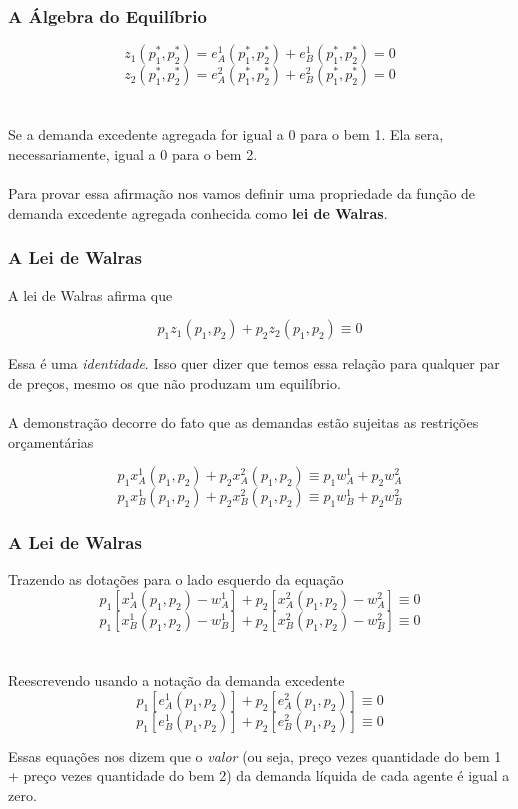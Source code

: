 \documentclass{beamer}[10]
\begin{document}
\begin{frame}
	\frametitle{A Álgebra do Equilíbrio}

	$$z_1(p_1^*,p_2^*) = e_A^1(p_1^*,p_2^*) + e_B^1(p_1^*,p_2^*) = 0$$
	$$z_2(p_1^*,p_2^*) = e_A^2(p_1^*,p_2^*) + e_B^2(p_1^*,p_2^*) = 0$$
	\\~\\
	Se a demanda excedente agregada for igual a 0 para o bem 1. Ela sera, necessariamente, igual a 0 para o bem 2. 
	\\~\\
	Para provar essa afirmação nos vamos definir uma propriedade da função de demanda excedente agregada conhecida como \textbf{lei de Walras}.

\end{frame}

\begin{frame}
	\frametitle{A Lei de Walras}

	A lei de Walras afirma que

	$$p_1 z_1(p_1,p_2) + p_2 z_2(p_1,p_2) \equiv 0$$

	Essa é uma \textit{identidade}. Isso quer dizer que temos essa relação para qualquer par de preços, mesmo os que não produzam um equilíbrio.
	\\~\\
	A demonstração decorre do fato que as demandas estão sujeitas as restrições orçamentárias

	$$p_1x_A^1(p_1,p_2) + p_2x_A^2(p_1,p_2) \equiv p_1w_A^1 + p_2w_A^2$$
	$$p_1x_B^1(p_1,p_2) + p_2x_B^2(p_1,p_2) \equiv p_1w_B^1 + p_2w_B^2$$

\end{frame}

\begin{frame}
	\frametitle{A Lei de Walras}

	Trazendo as dotações para o lado esquerdo da equação
	$$p_1[x_A^1(p_1,p_2) - w_A^1] + p_2[x_A^2(p_1,p_2) - w_A^2] \equiv 0$$
	$$p_1[x_B^1(p_1,p_2) - w_B^1] + p_2[x_B^2(p_1,p_2) - w_B^2] \equiv 0$$
	\\~\\
	Reescrevendo usando a notação da demanda excedente
	$$p_1[e_A^1(p_1,p_2)] + p_2[e_A^2(p_1,p_2)] \equiv 0$$
	$$p_1[e_B^1(p_1,p_2)] + p_2[e_B^2(p_1,p_2)] \equiv 0$$

	Essas equações nos dizem que o \textit{valor} (ou seja, preço vezes quantidade do bem 1 + preço vezes quantidade do bem 2) da demanda líquida de cada agente é igual a zero.

\end{frame}
\end{document}
